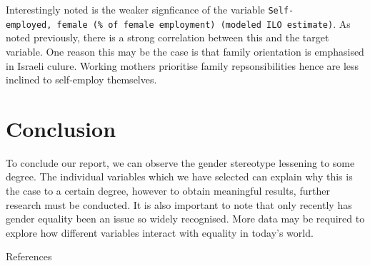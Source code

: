 \documentclass[11pt,a4paper,]{article}
\begin{document}
Interestingly noted is the weaker signficance of the variable
\texttt{Self-employed,\ female\ (\%\ of\ female\ employment)\ (modeled\ ILO\ estimate)}.
As noted previously, there is a strong correlation between this and the
target variable. One reason this may be the case is that family
orientation is emphasised in Israeli culure. Working mothers prioritise
family repsonsibilities hence are less inclined to self-employ
themselves.

\section*{Conclusion}

To conclude our report, we can observe the gender stereotype lessening
to some degree. The individual variables which we have selected can
explain why this is the case to a certain degree, however to obtain
meaningful results, further research must be conducted. It is also
important to note that only recently has gender equality been an issue
so widely recognised. More data may be required to explore how different
variables interact with equality in today's world.

References

\printbibliography
\end{document}
